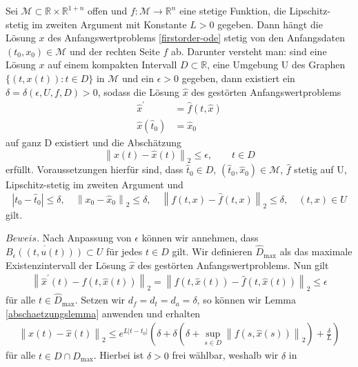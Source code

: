\begin{satz}
    \label{Satz-stet-abh}
    Sei $\mathcal{M} \subset \mathbb{R} \times \mathbb{R}^{1+n}$ offen und $f:\mathcal{M} \rightarrow \mathbb{R}^{n}$
    eine stetige Funktion, die Lipschitz-stetig im zweiten Argument mit Konstante $L>0$ gegeben. Dann hängt die
    Lösung $x$ des Anfangswertproblems \eqref{firstorder-ode} stetig von den Anfangsdaten $(t_0, x_0) \in \mathcal{M}$
    und der rechten Seite $f$ ab. Darunter versteht man:
    sind eine Lösung $x$ auf einem kompakten Intervall $D \subset \mathbb{R}$, eine Umgebung U des Graphen
    $\{(t,x(t)): t \in D\}$ in $\mathcal{M}$ und ein $\epsilon>0$ gegeben, dann existiert ein
    $\delta=\delta(\epsilon, U, f, D) >0$, sodass die Lösung $\hat{x}$ des gestörten Anfangswertproblems
    \begin{align*}
        \hat{x}^{\prime} &= \hat{f}(t,\hat{x})\\
        \hat{x}(\hat{t}_0) &= \hat{x}_0
    \end{align*}
    auf ganz D existiert und die Abschätzung
    \[
        \left\lVert x(t) - \hat{x}(t) \right\rVert_2 \leq \epsilon, \qquad t \in D
    \]
    erfüllt. Voraussetzungen hierfür sind, dass $\hat{t}_0 \in D$, $(\hat{t}_0, \hat{x}_0) \in \mathcal{M}$, $\hat{f}$
    stetig auf U, Lipschitz-stetig im zweiten Argument und
    \[
        |t_0 - \hat{t}_0| \leq \delta, \quad \left\lVert x_0 - \hat{x}_0 \right\rVert_2 \leq \delta, \quad
        \left\lVert f(t,x) - \hat{f}(t,x) \right\rVert_2 \leq \delta, \quad (t,x) \in U
    \] gilt.
\end{satz}
$Beweis.$ Nach Anpassung von $\epsilon$ können wir annehmen, dass $\overline{B_{\epsilon}((t, u(t)))} \subset U$ für
jedes $t \in D$ gilt. Wir definieren $\hat{D}_{\text{max}}$ als das maximale Existenzintervall der Lösung $\hat{x}$ des
gestörten Anfangswertproblems. Nun gilt
\begin{align*}
    \left\lVert \hat{x}^{\prime}(t) - f(t, \hat{x}(t)) \right\rVert_2 =
    \left\lVert f(t,\hat{x}(t)) - \hat{f}(t, \hat{x}(t)) \right\rVert_2 \leq \epsilon
\end{align*}
für alle $t \in \hat{D}_{\text{max}}$. Setzen wir $d_f = d_t = d_a = \delta$, so können wir Lemma
\ref{abschaetzungslemma} anwenden und erhalten
\begin{align*}
    \left\lVert x(t) - \hat{x}(t)\right\rVert_2 \leq e^{L|t-t_0|}(\delta + \delta(\delta +
    \sup\limits_{s \in D}\left\lVert f(s,\hat{x}(s))\right\rVert_2) + \frac{\delta}{L})
\end{align*}
für alle $t \in D \cap \hat{D}_{\text{max}}$. Hierbei ist $\delta > 0$ frei wählbar, weshalb wir $\delta$ in

